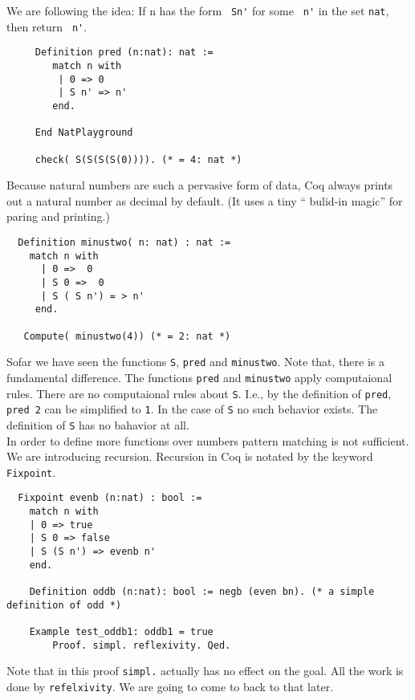   We are following the idea:  If n has the form \lstinline! Sn'! for some \lstinline! n'! in the set \lstinline!nat!, then return  \lstinline! n'!.
  \begin{example}
   \begin{lstlisting}
  	 Definition pred (n:nat): nat :=
   		match n with 
   	     | 0 => 0
   	     | S n' => n'
   	    end. 
   	  
   	 End NatPlayground
   	 
   	 check( S(S(S(S(0)))). (* = 4: nat *)
   \end{lstlisting}
  \end{example}
  Because natural numbers are such a pervasive form of data, Coq always prints out a natural number as decimal by default.
  (It uses a tiny `` bulid-in magic'' for paring and printing.)
 
  \begin{lstlisting}
  Definition minustwo( n: nat) : nat :=
    match n with
      | 0 =>  0
      | S 0 =>  0
      | S ( S n') = > n'
     end.
     
   Compute( minustwo(4)) (* = 2: nat *)
  \end{lstlisting}  
  Sofar we have seen the functions \lstinline!S!, \lstinline!pred! and \lstinline!minustwo!.
  Note that, there is a fundamental difference.
  The functions \lstinline!pred! and \lstinline!minustwo! apply computaional rules. 
  There are no computaional rules about \lstinline!S!.
  I.e., by the definition of \lstinline!pred!, \lstinline!pred 2! can be simplified to \lstinline!1!. 
  In the case of \lstinline!S! no such behavior exists.
  The definition of \lstinline!S! has no bahavior at all.\\ 
    
  In order to define more functions over numbers pattern matching is not sufficient. We are introducing recursion.
  Recursion in Coq is notated by the keyword \lstinline!Fixpoint!.
  
  \begin{lstlisting}
  Fixpoint evenb (n:nat) : bool :=
  	match n with
  	| 0 => true
  	| S 0 => false
  	| S (S n') => evenb n'
  	end.
  	
  	Definition oddb (n:nat): bool := negb (even bn). (* a simple definition of odd *)
  	
  	Example test_oddb1: oddb1 = true
    	Proof. simpl. reflexivity. Qed.
  \end{lstlisting}
   Note that in this proof \lstinline!simpl.! actually has no effect on the goal. 
   All the work is done by \lstinline!refelxivity!. 
   We are going to come to back to that later.
   
